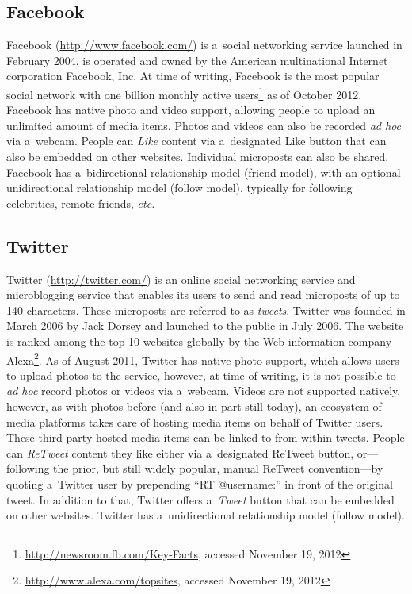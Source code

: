 \subsection{Facebook}

Facebook (\url{http://www.facebook.com/})
is a~social networking service launched in February 2004,
is operated and owned by the American multinational
Internet corporation Facebook, Inc.
At time of writing, Facebook is the most popular social network
with one billion monthly active
users\footnote{\url{http://newsroom.fb.com/Key-Facts},
accessed November 19, 2012}
as of October 2012.
Facebook has native photo and video support,
allowing people to upload an unlimited amount of media items.
Photos and videos can also be recorded \emph{ad hoc} via a~webcam.
People can \emph{Like} content via a~designated Like button
that can also be embedded on other websites.
Individual microposts can also be shared.
Facebook has a~bidirectional relationship model (friend model),
with an optional unidirectional relationship model (follow model),
typically for following celebrities, remote friends, \emph{etc.}

\subsection{Twitter}
\label{sec:twitter}

Twitter (\url{http://twitter.com/})
is an online social networking service
and microblogging service
that enables its users to send and read microposts
of up to 140 characters.
These microposts are referred to as \emph{tweets}.
Twitter was founded in March 2006 by Jack Dorsey
and launched to the public in July 2006.
The website is ranked among the top-10 websites globally
by the Web information company
Alexa\footnote{\url{http://www.alexa.com/topsites},
accessed November 19, 2012}.
As of August 2011, Twitter has native photo support,
which allows users to upload photos to the service, however,
at time of writing, it is not possible to \emph{ad hoc}
record photos or videos via a~webcam.
Videos are not supported natively, however,
as with photos before (and also in part still today),
an ecosystem of media platforms takes care of
hosting media items on behalf of Twitter users.
These third-party-hosted media items
can be linked to from within tweets.
People can \emph{ReTweet} content they like either
via a~designated ReTweet button,
or---following the prior, but still widely popular, manual ReTweet convention---by
quoting a~Twitter user by prepending ``RT @username:''
in front of the original tweet.
In addition to that, Twitter offers a~\emph{Tweet} button that can be embedded on other websites.
Twitter has a~unidirectional relationship model (follow model).

